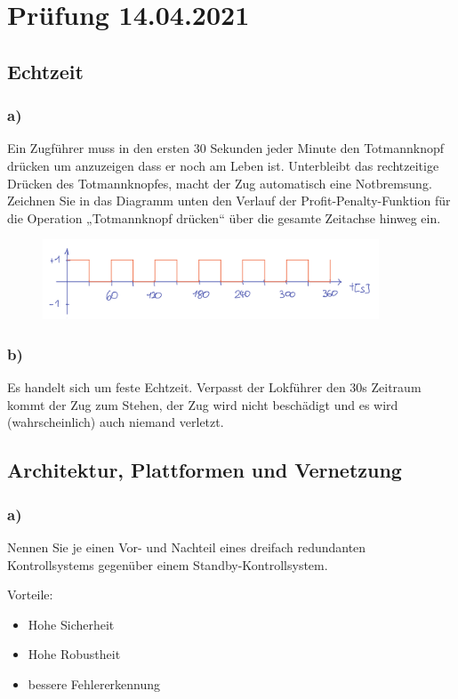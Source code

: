 \section{Prüfung 14.04.2021}
\subsection{Echtzeit}
\subsubsection{a)}
Ein Zugführer muss in den ersten 30 Sekunden jeder Minute den Totmannknopf drücken um
anzuzeigen dass er noch am Leben ist. Unterbleibt das rechtzeitige Drücken des Totmannknopfes,
macht der Zug automatisch eine Notbremsung.
Zeichnen Sie in das Diagramm unten den Verlauf der Profit-Penalty-Funktion für die Operation
„Totmannknopf drücken“ über die gesamte Zeitachse hinweg ein.

\begin{figure}[H]
  \includegraphics[width=10cm]{images/KA140421/1a.PNG}
  \centering
\end{figure}

\subsubsection{b)}
Es handelt sich um feste Echtzeit. Verpasst der Lokführer den 30s Zeitraum kommt der Zug zum Stehen, der 
Zug wird nicht beschädigt und es wird (wahrscheinlich) auch niemand verletzt.

\subsection{Architektur, Plattformen und Vernetzung}
\subsubsection{a)}
Nennen Sie je einen Vor- und Nachteil eines dreifach redundanten Kontrollsystems gegenüber einem
Standby-Kontrollsystem.

Vorteile:
\begin{itemize}
  \item Hohe Sicherheit
  \item Hohe Robustheit
  \item bessere Fehlererkennung
\end{itemize}

